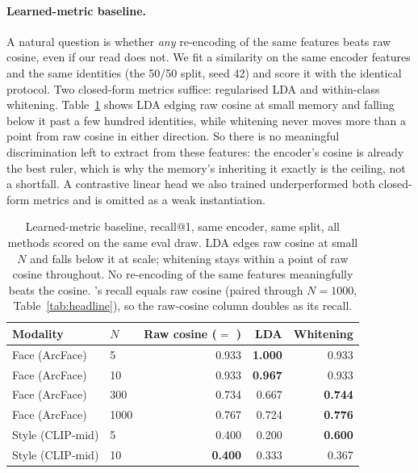 \paragraph{Learned-metric baseline.} A natural question is whether \emph{any} re-encoding of the same features beats raw cosine, even if our read does not. We fit a similarity on the same encoder features and the same identities (the 50/50 split, seed 42) and score it with the identical protocol. Two closed-form metrics suffice: regularised LDA and within-class whitening. Table~\ref{tab:learnedmetric} shows LDA edging raw cosine at small memory and falling below it past a few hundred identities, while whitening never moves more than a point from raw cosine in either direction. So there is no meaningful discrimination left to extract from these features: the encoder's cosine is already the best ruler, which is why the memory's inheriting it exactly is the ceiling, not a shortfall. A contrastive linear head we also trained underperformed both closed-form metrics and is omitted as a weak instantiation.

\begin{table}[h]
\small\centering
\caption{Learned-metric baseline, recall@1, same encoder, same split, all methods scored on the same eval draw. LDA edges raw cosine at small $N$ and falls below it at scale; whitening stays within a point of raw cosine throughout. No re-encoding of the same features meaningfully beats the cosine. \attmem{}'s recall equals raw cosine (paired through $N{=}1000$, Table~\ref{tab:headline}), so the raw-cosine column doubles as its recall.}
\label{tab:learnedmetric}
\begin{tabular}{@{}llrrr@{}}
\toprule
\textbf{Modality} & $N$ & \textbf{Raw cosine ($=$ \attmem{})} & \textbf{LDA} & \textbf{Whitening} \\
\midrule
Face (ArcFace)  & 5    & 0.933 & \textbf{1.000} & 0.933 \\
Face (ArcFace)  & 10   & 0.933 & \textbf{0.967} & 0.933 \\
Face (ArcFace)  & 300  & 0.734 & 0.667 & \textbf{0.744} \\
Face (ArcFace)  & 1000 & 0.767 & 0.724 & \textbf{0.776} \\
\midrule
Style (CLIP-mid) & 5   & 0.400 & 0.200 & \textbf{0.600} \\
Style (CLIP-mid) & 10  & \textbf{0.400} & 0.333 & 0.367 \\
\bottomrule
\end{tabular}
\end{table}

